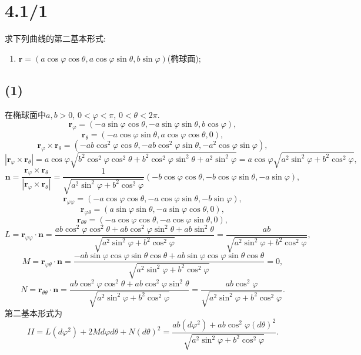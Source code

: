 \documentclass[11pt,a4paper]{article}
\author{刘逸灏 (515370910207)}
\begin{document}
\maketitle

\section{4.1/1}
\begin{problem}
求下列曲线的第二基本形式:
\begin{enumerate}
  \item $\mathbf{r}=(a\cos\varphi\cos\theta,a\cos\varphi\sin\theta,b\sin\varphi)$(椭球面);
\end{enumerate}
\end{problem}

\subsection*{(1)}
在椭球面中$a,b>0$, $0<\varphi<\pi$, $0<\theta<2\pi$.
$$\mathbf{r}_\varphi=(-a\sin\varphi\cos\theta,-a\sin\varphi\sin\theta,b\cos\varphi),$$
$$\mathbf{r}_\theta=(-a\cos\varphi\sin\theta,a\cos\varphi\cos\theta,0),$$
$$\mathbf{r}_\varphi\times\mathbf{r}_\theta=(-ab\cos^2\varphi\cos\theta,-ab\cos^2\varphi\sin\theta,-a^2\cos\varphi\sin\varphi),$$
$$|\mathbf{r}_\varphi\times\mathbf{r}_\theta|=a\cos\varphi\sqrt{b^2\cos^2\varphi\cos^2\theta+b^2\cos^2\varphi\sin^2\theta+a^2\sin^2\varphi}=a\cos\varphi\sqrt{a^2\sin^2\varphi+b^2\cos^2\varphi},$$
$$\mathbf{n}=\frac{\mathbf{r}_\varphi\times\mathbf{r}_\theta}{|\mathbf{r}_\varphi\times\mathbf{r}_\theta|}=\frac{1}{\sqrt{a^2\sin^2\varphi+b^2\cos^2\varphi}}(-b\cos\varphi\cos\theta,-b\cos\varphi\sin\theta,-a\sin\varphi),$$
$$\mathbf{r}_{\varphi\varphi}=(-a\cos\varphi\cos\theta,-a\cos\varphi\sin\theta,-b\sin\varphi),$$
$$\mathbf{r}_{\varphi\theta}=(a\sin\varphi\sin\theta,-a\sin\varphi\cos\theta,0),$$
$$\mathbf{r}_{\theta\theta}=(-a\cos\varphi\cos\theta,-a\cos\varphi\sin\theta,0),$$
$$L=\mathbf{r}_{\varphi\varphi}\cdot\mathbf{n}=\frac{ab\cos^2\varphi\cos^2\theta+ab\cos^2\varphi\sin^2\theta+ab\sin^2\theta}{\sqrt{a^2\sin^2\varphi+b^2\cos^2\varphi}}=\frac{ab}{\sqrt{a^2\sin^2\varphi+b^2\cos^2\varphi}},$$
$$M=\mathbf{r}_{\varphi\theta}\cdot\mathbf{n}=\frac{-ab\sin\varphi\cos\varphi\sin\theta\cos\theta+ab\sin\varphi\cos\varphi\sin\theta\cos\theta}{\sqrt{a^2\sin^2\varphi+b^2\cos^2\varphi}}=0,$$
$$N=\mathbf{r}_{\theta\theta}\cdot\mathbf{n}=\frac{ab\cos^2\varphi\cos^2\theta+ab\cos^2\varphi\sin^2\theta}{\sqrt{a^2\sin^2\varphi+b^2\cos^2\varphi}}=\frac{ab\cos^2\varphi}{\sqrt{a^2\sin^2\varphi+b^2\cos^2\varphi}}.$$
第二基本形式为
$$II=L(d\varphi^2)+2Md\varphi d\theta+N(d\theta)^2=\frac{ab(d\varphi^2)+ab\cos^2\varphi(d\theta)^2}{\sqrt{a^2\sin^2\varphi+b^2\cos^2\varphi}}.$$
\end{document}

